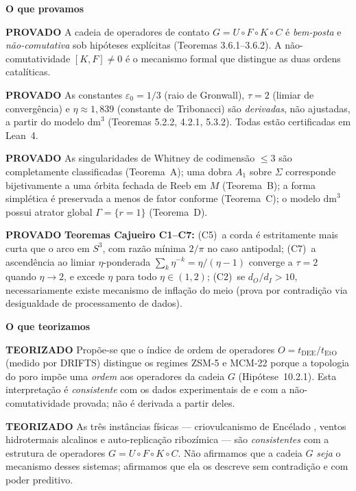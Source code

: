 \documentclass[12pt,a4paper,twoside]{book}
\theoremstyle{plain}
\theoremstyle{definition}
\newcommand{\provadostamp}{\noindent\colorbox{cajunavy!10}{\color{cajunavy}\bfseries\small PROVADO}\quad}
\newcommand{\teorizadostamp}{\noindent\colorbox{cajugold!20}{\color{cajugold!60!black}\bfseries\small TEORIZADO}\quad}
\theoremstyle{definition}
\newcommand{\epsz}{\varepsilon_{0}}
\newcommand{\tribo}{\eta}
\newcommand{\dm}{\mathrm{dm}^{3}}
\begin{document}
\bigskip
\noindent\textbf{\large O que provamos}

\smallskip
\provadostamp
A cadeia de operadores de contato $G = U \circ F \circ K \circ C$
é \emph{bem-posta} e \emph{não-comutativa} sob hipóteses explícitas
(Teoremas 3.6.1--3.6.2). A não-comutatividade $[K,F]\ne 0$ é o mecanismo
formal que distingue as duas ordens catalíticas.

\provadostamp
As constantes $\epsz = 1/3$ (raio de Gronwall), $\tau = 2$ (limiar de
convergência) e $\tribo \approx 1{,}839$ (constante de Tribonacci) são
\emph{derivadas}, não ajustadas, a partir do modelo $\dm$
(Teoremas 5.2.2, 4.2.1, 5.3.2). Todas estão certificadas em Lean~4.

\provadostamp
As singularidades de Whitney de codimensão $\le 3$ são completamente
classificadas (Teorema~A); uma dobra $A_1$ sobre $\Sigma$ corresponde
bijetivamente a uma órbita fechada de Reeb em $M$ (Teorema~B); a
forma simplética é preservada a menos de fator conforme (Teorema~C);
o modelo $\dm$ possui atrator global $\Gamma = \{r=1\}$ (Teorema~D).

\provadostamp
\textbf{Teoremas Cajueiro C1--C7:}
(C5)~a corda é estritamente mais curta que o arco em $S^{3}$, com razão mínima
$2/\pi$ no caso antipodal;
(C7)~a ascendência ao limiar $\eta$-ponderada $\sum_{k}\eta^{-k} = \eta/(\eta-1)$ converge
a $\tau = 2$ quando $\eta \to 2$, e excede $\eta$ para todo $\eta \in (1,2)$;
(C2)~se $d_O/d_I > 10$, necessariamente existe mecanismo de inflação do meio
(prova por contradição via desigualdade de processamento de dados).

\bigskip
\noindent\textbf{\large O que teorizamos}

\smallskip
\teorizadostamp
Propõe-se que o índice de ordem de operadores $O = t_{\mathrm{DEE}}/t_{\mathrm{EtO}}$
(medido por DRIFTS) distingue os regimes ZSM-5 e MCM-22 porque a topologia
do poro impõe uma \emph{ordem} aos operadores da cadeia $G$
(Hipótese~10.2.1). Esta interpretação é \emph{consistente} com os
dados experimentais de \cite{Sousa2014,Sousa2023} e com a não-comutatividade
provada; não é derivada a partir deles.

\teorizadostamp
As três instâncias físicas --- criovulcanismo de Encélado
\cite{Khawaja2025}, ventos hidrotermais alcalinos \cite{Russell,Sojo}
e auto-replicação ribozímica \cite{Joyce} --- são \emph{consistentes}
com a estrutura de operadores $G = U \circ F \circ K \circ C$. Não
afirmamos que a cadeia $G$ \emph{seja} o mecanismo desses sistemas;
afirmamos que ela os descreve sem contradição e com poder preditivo.
\end{document}
